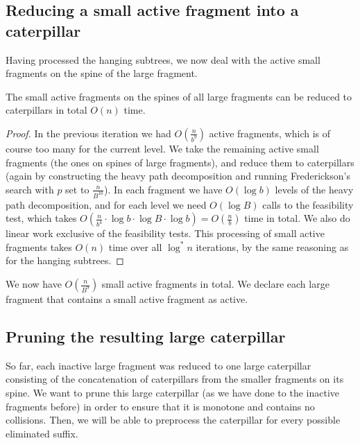 \documentclass[a4paper,UKenglish]{lipics-v2016}
\theoremstyle{plain}
\begin{document}
\subsection{Reducing a small active fragment into a caterpillar}\label{section:lemma2}
Having processed the hanging subtrees, we now deal with the active small fragments on the spine of the large fragment. 

\begin{lemma}\label{lemma2}
	The small active fragments on the spines of all large fragments can be reduced to caterpillars in total $O(n)$ time. 
\end{lemma}
\begin{proof}

In the previous iteration we had $O(\frac{n}{b^9})$ active fragments, which is of course
too many for the current level. We take the remaining active small fragments (the ones on spines of large 
fragments), and reduce them to caterpillars (again by constructing the heavy path decomposition and running
Frederickson's search with $p$ set to $\frac{n}{B^{10}}$). In each fragment we have $O(\log b)$ levels of the heavy
path decomposition, and for each level we need $O(\log B)$ calls to the feasibility test, which takes
$O(\frac{n}{b^4} \cdot \log b \cdot \log B \cdot \log b) = O(\frac{n}{b})$ time in total. We also do linear
work exclusive of the feasibility tests. This processing of small active fragments takes $O(n)$ time over all
$\log ^*n$ iterations, by the same reasoning as for the hanging subtrees.
\end{proof}


We now have $O(\frac{n}{B^9})$ small active fragments in total. We declare each large fragment that contains a small active fragment as active. 

\subsection{Pruning the resulting large caterpillar}\label{section:lemma3}
So far, each inactive large fragment was reduced to one large caterpillar consisting of the concatenation of caterpillars from the smaller fragments on its spine. We want
to prune this large caterpillar (as we have done to the inactive fragments before) in order to ensure
that it is monotone and contains no collisions.   Then, we will
be able to preprocess the caterpillar for every possible eliminated suffix.
\end{document}
